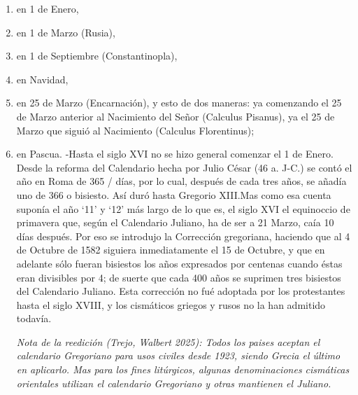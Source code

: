 \raggedbottom{} \documentclass[12pt, a4paper]{book}
\begin{document}
\begin{enumerate}
\begin{enumerate}
\begin{enumerate}
                  \item en 1 de Enero,
                  \item en 1 de Marzo (Rusia),
                  \item en 1 de Septiembre (Constantinopla),
                  \item en Navidad,
                  \item en 25 de Marzo (Encarnación), y esto de dos maneras: ya comenzando el 25 de Marzo anterior al Nacimiento del Señor (Calculus Pisanus), ya el 25 de Marzo que siguió al Nacimiento (Calculus Florentinus);
                  \item en Pascua. -Hasta el siglo XVI no se hizo general comenzar el 1 de Enero. Desde la reforma del Calendario hecha por Julio César (46 a. J-C.) se contó el año en Roma de 365 / días, por lo cual, después de cada tres años, se añadía uno de 366 o bisiesto. Así duró hasta Gregorio XIII.\@ Mas como esa cuenta suponía el año `11' y `12' más largo de lo que es, el siglo XVI el equinoccio de primavera que, según el Calendario Juliano, ha de ser a 21 Marzo, caía 10 días después. Por eso se introdujo la Corrección gregoriana, haciendo que al 4 de Octubre de 1582 siguiera inmediatamente el 15 de Octubre, y que en adelante sólo fueran bisiestos los años expresados por centenas cuando éstas eran divisibles por 4; de suerte que cada 400 años se suprimen tres bisiestos del Calendario Juliano. Esta corrección no fué adoptada por los protestantes hasta el siglo XVIII, y los cismáticos griegos y rusos no la han admitido todavía.

                        \textit{Nota de la reedición (Trejo, Walbert 2025): Todos los paises aceptan el calendario Gregoriano para usos civiles desde 1923, siendo Grecia el último en aplicarlo. Mas para los fines litúrgicos, algunas denominaciones cismáticas orientales utilizan el calendario Gregoriano y otras mantienen el Juliano.}
                \end{enumerate}
        \end{enumerate}
\end{enumerate}
\end{document}
